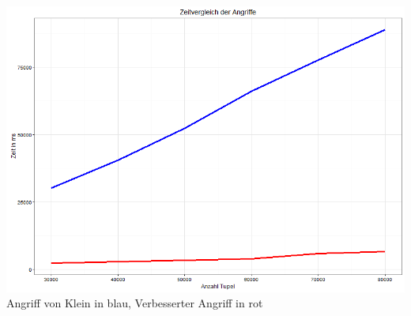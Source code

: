 \documentclass[10pt,a4paper]{article}
\begin{document}
\includegraphics[width=\textwidth]{img/vergleich.png}
\label{fig:vergleich}
\\
Angriff von Klein in blau, Verbesserter Angriff in rot

\newpage

\nocite{*}
\printbibliography
\end{document}
